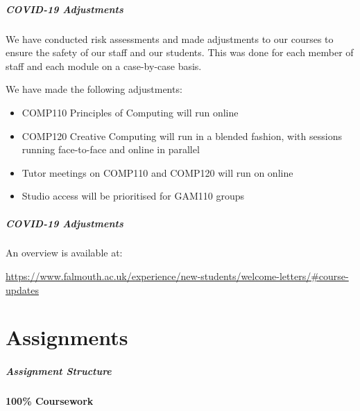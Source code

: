 \begin{frame}
	\frametitle{COVID-19 Adjustments}
	
	We have conducted risk assessments and made adjustments to our courses to ensure the safety of our staff and our students. This was done for each member of staff and each module on a case-by-case basis.
	
	\vspace{0.5em}
	
	We have made the following adjustments:
	
	\vspace{0.5em}
	
	\begin{itemize}
		\item COMP110 Principles of Computing will run online
		\item COMP120 Creative Computing will run in a blended fashion, with sessions running face-to-face and online in parallel
		\item Tutor meetings on COMP110 and COMP120 will run on online
		\item Studio access will be prioritised for GAM110 groups
	\end{itemize}
	
\end{frame}

\begin{frame}
	\frametitle{COVID-19 Adjustments}
		
	An overview is available at: 
	
	\vspace{0.5em}
	
	\url{https://www.falmouth.ac.uk/experience/new-students/welcome-letters/\#course-updates}
	
\end{frame}

\part{Assignments}
\frame{\partpage}

\begin{frame}
	\frametitle{Assignment Structure}
	
	\begin{Huge}
		\begin{center}
			\textbf{100\% Coursework}
		\end{center}
	\end{Huge}

\end{frame}

